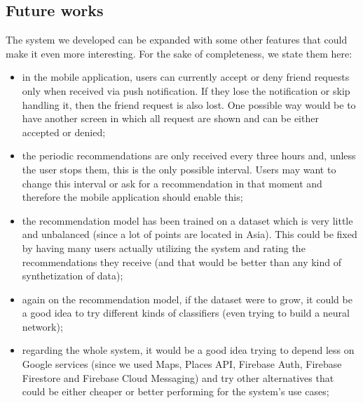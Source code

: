 \documentclass[../../main]{subfiles}
\begin{document}
\subsection{Future works}
\label{ss:future-works}

The system we developed can be expanded with some other features that could make it even more interesting. For the sake of completeness, we state them here:
\begin{itemize}
    \item in the mobile application, users can currently accept or deny friend requests only when received via push notification. 
    If they lose the notification or skip handling it, then the friend request is also lost.
    One possible way would be to have another screen in which all request are shown and can be either accepted or denied;
    \item the periodic recommendations are only received every three hours and, unless the user stops them, this is the only possible interval.
    Users may want to change this interval or ask for a recommendation in that moment and therefore the mobile application should enable this;
    \item the recommendation model has been trained on a dataset which is very little and unbalanced (since a lot of points are located in Asia).
    This could be fixed by having many users actually utilizing the system and rating the recommendations they receive (and that would be better than any kind of synthetization of data);
    \item again on the recommendation model, if the dataset were to grow, it could be a good idea to try different kinds of classifiers (even trying to build a neural network);
    \item regarding the whole system, it would be a good idea trying to depend less on Google services (since we used Maps, Places API, Firebase Auth, Firebase Firestore and Firebase Cloud Messaging) and try other alternatives that could be either cheaper or better performing for the system's use cases;
\end{itemize}
\end{document}
